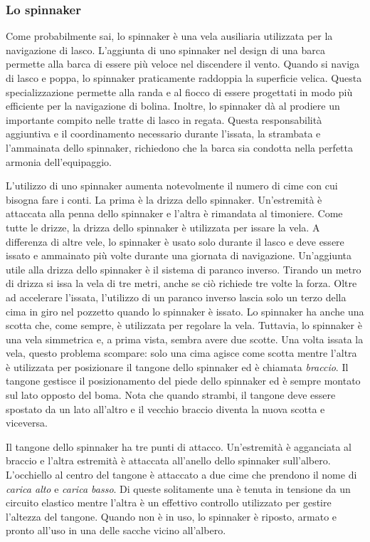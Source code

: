 \subsubsection{Lo spinnaker}
\label{sec:spinnaker}
Come probabilmente sai, lo spinnaker è una vela ausiliaria utilizzata
per la navigazione di lasco. L'aggiunta di uno spinnaker nel design di una barca
permette alla barca di essere più veloce nel discendere il vento. Quando si
naviga di lasco e poppa, lo spinnaker praticamente raddoppia la superficie
velica. Questa specializzazione permette alla randa e al fiocco di essere
progettati in modo più efficiente per la navigazione di bolina. Inoltre, lo
spinnaker dà al prodiere un importante compito nelle tratte di lasco in regata.
Questa responsabilità aggiuntiva e il coordinamento necessario durante l'issata,
la strambata e l'ammainata dello spinnaker, richiedono che la barca sia
condotta nella perfetta armonia dell'equipaggio.

L'utilizzo di uno spinnaker aumenta notevolmente il numero di cime con cui
bisogna fare i conti. La prima è la drizza dello spinnaker. Un'estremità è attaccata
alla penna dello spinnaker e l'altra è rimandata al timoniere. Come tutte le
drizze, la drizza dello spinnaker è utilizzata per issare la vela. A differenza
di altre vele, lo spinnaker è usato solo durante il lasco e deve essere issato e
ammainato più volte durante una giornata di navigazione. Un'aggiunta utile alla
drizza dello spinnaker è il sistema di paranco inverso. Tirando un metro di
drizza si issa la vela di tre metri, anche se ciò richiede tre volte la forza.
Oltre ad accelerare l'issata, l'utilizzo di un paranco inverso lascia solo un
terzo della cima in giro nel pozzetto quando lo spinnaker è issato. Lo spinnaker
ha anche una scotta che, come sempre, è utilizzata per regolare la vela.
Tuttavia, lo spinnaker è una vela simmetrica e, a prima vista, sembra avere due
scotte. Una volta issata la vela, questo problema scompare: solo una cima agisce
come scotta mentre l'altra è utilizzata per posizionare il tangone dello
spinnaker ed è chiamata \emph{braccio}. Il tangone gestisce il posizionamento del piede dello
spinnaker ed è sempre montato sul lato opposto del boma. Nota che quando
strambi, il tangone deve essere spostato da un lato all'altro e il vecchio braccio
diventa la nuova scotta e viceversa.

Il tangone dello spinnaker ha tre punti di attacco. Un'estremità è agganciata al
braccio e l'altra estremità è attaccata all'anello dello spinnaker sull'albero.
L'occhiello al centro del tangone è attaccato a due cime che prendono il nome di
\emph{carica alto} e \emph{carica basso}. Di queste solitamente una è tenuta in
tensione da un circuito elastico mentre l'altra è un effettivo controllo utilizzato per gestire
l'altezza del tangone. Quando non è in uso, lo spinnaker è riposto, armato e
pronto all'uso in una delle sacche vicino all'albero.

